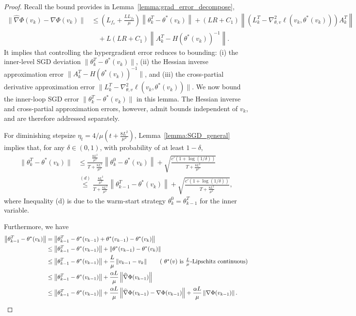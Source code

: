 \documentclass[10pt,a4paper]{amsart}
\begin{document}
\begin{proof}\label{app:proof_grad_error}
Recall the bound provides in Lemma~\ref{lemma:grad_error_decompose},
\begin{align}
    \|\widehat{\nabla}\Phi(v_k)-\nabla\Phi(v_k)\|&\leq\left(L_{f_v}+\frac{LL_{f_\theta}}{\mu} \right)\left\| \theta_k^T-\theta^*(v_k) \right\| + (LR+C_1)\left \|\left(L_k^T - \nabla_{\theta,v}^2\ell(v_k,\theta^*(v_k))
    \right) A_k^T \right\| \nonumber\\
    &\quad +  L(LR+C_1) \left\| A_k^T -  H(\theta^*(v_k))^{-1} \right\|\label{eq:grad_to_theta}.
\end{align}
It implies that controlling the hypergradient error reduces to bounding:  
(i) the inner-level SGD deviation $\|\theta_k^{T} - \theta^*(v_k)\|$,  
(ii) the Hessian inverse approximation error $\|A_k^{T} - H(\theta^*(v_k))^{-1}\|$, 
and (iii) the cross-partial derivative approximation error  
$\|L_k^{T} - \nabla_{\theta,v}^2\ell(v_k,\theta^*(v_k))\|$. We now bound the inner-loop SGD error $\|\theta_k^T-\theta^*(v_k)\|$ in this lemma. The Hessian inverse and cross-partial approximation errors, however, admit bounds independent of $v_k$, and
are therefore addressed separately. 

For diminishing stepsize $\eta_t = 4/{\mu(t+\frac{8L^2}{\mu^2})}$, Lemma~\ref{lemma:SGD_general} implies that, for any $\delta\in(0,1)$, with probability of at least $1-\delta$,
\begin{align}
    \|\theta_k^T - \theta^*(v_k)\| 
    &\leq \frac{\frac{8L^2}{\mu^2}}{T+\frac{8L^2}{\mu^2}}\left\| \theta_k^{0} - \theta^*(v_k)\right\| + \sqrt{\frac{c'(1+\log(1/\delta))}{T+\frac{8L^2}{\mu^2}}}\nonumber\\
    & \overset{(d)}{\leq} \frac{\frac{8L^2}{\mu^2}}{T+\frac{8L^2}{\mu^2}}\left\| \theta_{k-1}^{T} - \theta^*(v_k)\right\| + \sqrt{\frac{c'(1+\log(1/\delta))}{T+\frac{8L^2}{\mu^2}}}\label{eq:thm4_theta_connect},
\end{align}
where Inequality (d) is due to the warm-start strategy $\theta_k^0=\theta_{k-1}^T$ for the inner variable.

Furthermore, we have
\begin{align}
    \left\| \theta_{k-1}^{T} - \theta^*(v_k)\right\|&=\left\| \theta_{k-1}^{T} - \theta^*(v_{k-1})+\theta^*(v_{k-1})-\theta^*(v_k)\right\| \nonumber\\
    &\leq \left\|\theta_{k-1}^{T} - \theta^*(v_{k-1}) \right\|  +  \left\|\theta^*(v_{k-1}) - \theta^*(v_k) \right\| \nonumber\\
    &\leq \left\|\theta_{k-1}^{T} - \theta^*(v_{k-1}) \right\|  +  \frac{L}{\mu}\left\|v_{k-1}-v_k\right\| \tag{ $\theta^*(v)$ is $\frac{L}{\mu}$-Lipschitz continuous}\\
    &\leq \left\|\theta_{k-1}^{T} - \theta^*(v_{k-1}) \right\|  +  \frac{\alpha L}{\mu}\left\| \widehat{\nabla}\Phi(v_{k-1}) \right\| \nonumber\\
    & \leq  \left\|\theta_{k-1}^{T} - \theta^*(v_{k-1}) \right\|  +  \frac{\alpha L}{\mu}\left\| \widehat{\nabla}\Phi(v_{k-1})-\nabla\Phi(v_{k-1})\right\|  + \frac{\alpha L}{\mu} \left\| \nabla\Phi(v_{k-1}) \right\|. \label{eq:theta_kk-1}
\end{align}


\end{proof}
\end{document}
